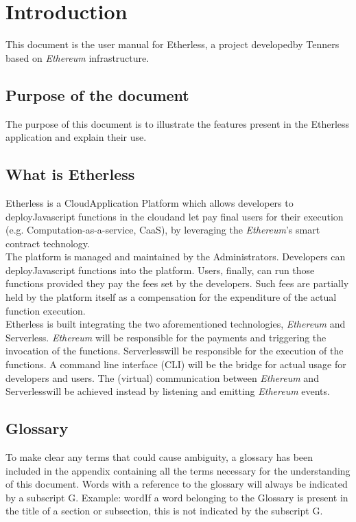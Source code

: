 \section{Introduction}
This document is the user manual for Etherless, a project developed\glo by Tenners based on \textit{Ethereum\glo} infrastructure.

\subsection{Purpose of the document}
The purpose of this document is to illustrate the features present in the Etherless application and explain their use.

\subsection{What is Etherless}
Etherless is a Cloud\glo Application Platform which allows developers to deploy\glo Javascript functions in the cloud\glo and let pay final users for their execution (e.g. Computation-as-a-service, CaaS), by leveraging the \textit{Ethereum\glos}'s smart contract technology.\\
The platform is managed and maintained by the Administrators. 
Developers can deploy\glo Javascript functions into the platform. Users, finally, can run those functions provided they pay the fees set by the developers. Such fees are partially held by the platform itself as a compensation for the expenditure of the actual function execution.\\
Etherless is built integrating the two aforementioned technologies, \textit{Ethereum\glo} and Serverless\glos. \textit{Ethereum\glo} will be responsible for the payments and triggering the invocation of the functions. Serverless\glo will be responsible for the execution of the functions. A command line interface (CLI\glo) will be the bridge for actual usage for developers and users. The (virtual) communication between \textit{Ethereum\glo} and Serverless\glo will be achieved instead by listening and emitting \textit{Ethereum\glo} events. 


\subsection{Glossary}
To make clear any terms that could cause ambiguity, a glossary has been included in the appendix containing all the terms necessary for the understanding of this document. Words with a reference to the glossary will always be indicated by a subscript G. Example: word\glo If a word belonging to the Glossary is present in the title of a section or subsection, this is not indicated by the subscript G.
